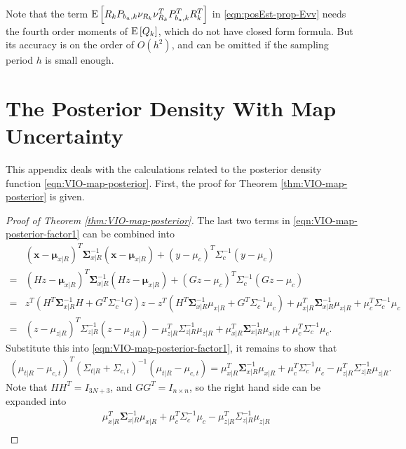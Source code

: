 Note that the term $\mathrm{E}\left[ R_kP_{b_a,k}\nu_{R_k}\nu_{R_k}^TP_{b_a,k}^TR_k^T \right]$ in \eqref{eqn:posEst-prop-Evv} needs the fourth order moments of $\mathrm{E}\left[ Q_k \right]$, which do not have closed form formula.
But its accuracy is on the order of $O(h^2)$, and can be omitted if the sampling period $h$ is small enough.

\chapter{The Posterior Density With Map Uncertainty} \label{app:VIO-map-posterior}

This appendix deals with the calculations related to the posterior density function \eqref{eqn:VIO-map-posterior}.
First, the proof for Theorem \ref{thm:VIO-map-posterior} is given.

\begin{proof}[Proof of Theorem \ref{thm:VIO-map-posterior}]
	The last two terms in \eqref{eqn:VIO-map-posterior-factor1} can be combined into
	\begin{align*}
		&(\bm{x}-\bm{\mu}_{x|R})^T \bm{\Sigma}_{x|R}^{-1} (\bm{x}-\bm{\mu}_{x|R}) + (y-\mu_c)^T \Sigma_c^{-1} (y-\mu_c) \\
		= &(Hz-\bm{\mu}_{x|R})^T \bm{\Sigma}_{x|R}^{-1} (Hz-\bm{\mu}_{x|R}) + (Gz-\mu_c)^T \Sigma_c^{-1} (Gz-\mu_c) \\
		= &z^T \left( H^T\bm{\Sigma}_{x|R}^{-1}H + G^T\Sigma_c^{-1}G \right) z - z^T \left( H^T\bm{\Sigma}_{x|R}^{-1}\mu_{x|R} + G^T\Sigma_c^{-1}\mu_c \right) + \mu_{x|R}^T \bm{\Sigma}_{x|R}^{-1} \mu_{x|R} + \mu_c^T \Sigma_c^{-1} \mu_c \\
		= & (z-\mu_{z|R})^T \Sigma_{z|R}^{-1} (z-\mu_{z|R}) - \mu_{z|R}^T \Sigma_{z|R}^{-1} \mu_{z|R} + \mu_{x|R}^T \bm{\Sigma}_{x|R}^{-1} \mu_{x|R} + \mu_c^T \Sigma_c^{-1} \mu_c.
	\end{align*}
	Substitute this into \eqref{eqn:VIO-map-posterior-factor1}, it remains to show that
	\begin{align*}
		(\mu_{t|R}-\mu_{c,t})^T (\Sigma_{t|R} + \Sigma_{c,t})^{-1} (\mu_{t|R}-\mu_{c,t}) = \mu_{x|R}^T \bm{\Sigma}_{x|R}^{-1} \mu_{x|R} + \mu_c^T \Sigma_c^{-1} \mu_c - \mu_{z|R}^T \Sigma_{z|R}^{-1} \mu_{z|R}.
	\end{align*}
	Note that $HH^T = I_{3N+3}$, and $GG^T = I_{n\times n}$, so the right hand side can be expanded into
	\begin{align} \label{eqn:VIO-three-terms}
		&\mu_{x|R}^T \bm{\Sigma}_{x|R}^{-1} \mu_{x|R} + \mu_c^T \Sigma_c^{-1} \mu_c - \mu_{z|R}^T \Sigma_{z|R}^{-1} \mu_{z|R} \nonumber \\

\end{align}
\end{proof}
